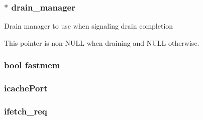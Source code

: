 \hypertarget{classAtomicSimpleCPU_af9ba920f669cbe0f18c71846715d690a}{
\subsubsection[{drain\_\-manager}]{$\ast$ {\bf drain\_\-manager}}}
\label{classAtomicSimpleCPU_af9ba920f669cbe0f18c71846715d690a}
Drain manager to use when signaling drain completion

This pointer is non-\/NULL when draining and NULL otherwise. \hypertarget{classAtomicSimpleCPU_a66f9c88f6fa05c882787a7e98a7101f5}{
\subsubsection[{fastmem}]{\setlength{\rightskip}{0pt plus 5cm}bool {\bf fastmem}}}
\label{classAtomicSimpleCPU_a66f9c88f6fa05c882787a7e98a7101f5}
\hypertarget{classAtomicSimpleCPU_a35e511691227100effd63e8a7fc12989}{
\subsubsection[{icachePort}]{ {\bf icachePort}}}
\label{classAtomicSimpleCPU_a35e511691227100effd63e8a7fc12989}
\hypertarget{classAtomicSimpleCPU_a64ba0dde58d6c2c1c5e24a0b3e3b506f}{
\subsubsection[{ifetch\_\-req}]{ {\bf ifetch\_\-req}}}
\label{classAtomicSimpleCPU_a64ba0dde58d6c2c1c5e24a0b3e3b506f}
